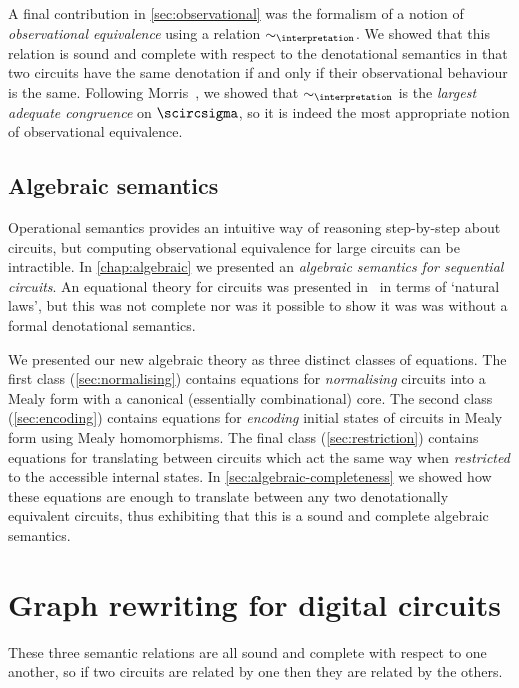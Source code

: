 A final contribution in \cref{sec:observational} was the formalism of a notion
of \emph{observational equivalence} using a relation \(\sim_\interpretation\).
We showed that this relation is sound and complete with respect to the
denotational semantics in that two circuits have the same denotation if and only
if their observational behaviour is the same.
Following Morris~\cite{morris1969lambdacalculus,gordon1980denotational}, we
showed that \(\sim_\interpretation\) is the \emph{largest adequate congruence}
on \(\scircsigma\), so it is indeed the most appropriate notion of observational
equivalence.

\subsection{Algebraic semantics}

Operational semantics provides an intuitive way of reasoning step-by-step
about circuits, but computing observational equivalence for large circuits can
be intractible.
In \cref{chap:algebraic} we presented an
\emph{algebraic semantics for sequential circuits}.
An equational theory for circuits was presented in~\cite{ghica2016categorical}
in terms of `natural laws', but this was not complete nor was it possible
to show it was was without a formal denotational semantics.

We presented our new algebraic theory as three distinct classes of equations.
The first class (\cref{sec:normalising}) contains equations for
\emph{normalising} circuits into a Mealy form with a canonical (essentially
combinational) core.
The second class (\cref{sec:encoding}) contains equations for \emph{encoding}
initial states of circuits in Mealy form using Mealy homomorphisms.
The final class (\cref{sec:restriction}) contains equations for translating
between circuits which act the same way when \emph{restricted} to the
accessible internal states.
In \cref{sec:algebraic-completeness} we showed how these equations are enough to
translate between any two denotationally equivalent circuits, thus exhibiting
that this is a sound and complete algebraic semantics.

\section{Graph rewriting for digital circuits}

These three semantic relations are all sound and complete with respect to one
another, so if two circuits are related by one then they are related by the
others.

